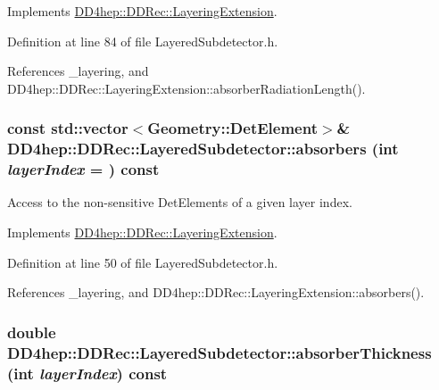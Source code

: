 Implements \hyperlink{class_d_d4hep_1_1_d_d_rec_1_1_layering_extension_aca33441136624022aa7414895ba81fef}{DD4hep::DDRec::LayeringExtension}.

Definition at line 84 of file LayeredSubdetector.h.

References \_\-layering, and DD4hep::DDRec::LayeringExtension::absorberRadiationLength().\hypertarget{class_d_d4hep_1_1_d_d_rec_1_1_layered_subdetector_a5359b752b8f6105c65fbe3e65044fdcb}{
\subsubsection[{absorbers}]{\setlength{\rightskip}{0pt plus 5cm}const std::vector$<${\bf Geometry::DetElement}$>$\& DD4hep::DDRec::LayeredSubdetector::absorbers (int {\em layerIndex} = {}) const}}
\label{class_d_d4hep_1_1_d_d_rec_1_1_layered_subdetector_a5359b752b8f6105c65fbe3e65044fdcb}


Access to the non-\/sensitive DetElements of a given layer index. 

Implements \hyperlink{class_d_d4hep_1_1_d_d_rec_1_1_layering_extension_a1204ac80c52fbca9ce3f71e2b3662eab}{DD4hep::DDRec::LayeringExtension}.

Definition at line 50 of file LayeredSubdetector.h.

References \_\-layering, and DD4hep::DDRec::LayeringExtension::absorbers().\hypertarget{class_d_d4hep_1_1_d_d_rec_1_1_layered_subdetector_a8faf64a31a2b59b038ad5e76a70f4220}{
\subsubsection[{absorberThickness}]{\setlength{\rightskip}{0pt plus 5cm}double DD4hep::DDRec::LayeredSubdetector::absorberThickness (int {\em layerIndex}) const}}
\label{class_d_d4hep_1_1_d_d_rec_1_1_layered_subdetector_a8faf64a31a2b59b038ad5e76a70f4220}


